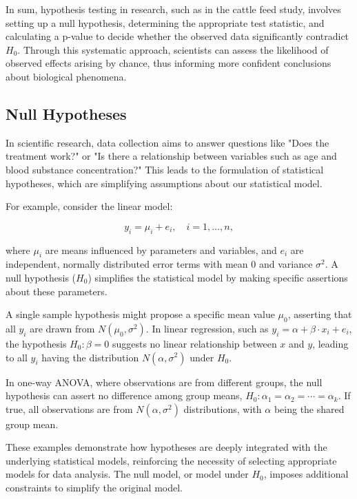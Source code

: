 \documentclass{article}
\begin{document}
In sum, hypothesis testing in research, such as in the cattle feed study, involves setting up a null hypothesis, determining the appropriate test statistic, and calculating a p-value to decide whether the observed data significantly contradict $H_0$. Through this systematic approach, scientists can assess the likelihood of observed effects arising by chance, thus informing more confident conclusions about biological phenomena.

\subsection{Null Hypotheses}

In scientific research, data collection aims to answer questions like "Does the treatment work?" or "Is there a relationship between variables such as age and blood substance concentration?" This leads to the formulation of statistical hypotheses, which are simplifying assumptions about our statistical model.

For example, consider the linear model:

\[
y_{i} = \mu_{i} + e_{i}, \quad i = 1, \ldots, n,
\]

where $\mu_{i}$ are means influenced by parameters and variables, and $e_{i}$ are independent, normally distributed error terms with mean 0 and variance $\sigma^{2}$. A null hypothesis ($H_0$) simplifies the statistical model by making specific assertions about these parameters.

A single sample hypothesis might propose a specific mean value $\mu_0$, asserting that all $y_i$ are drawn from $N(\mu_0, \sigma^2)$. In linear regression, such as $y_i = \alpha + \beta \cdot x_i + e_i$, the hypothesis $H_0: \beta = 0$ suggests no linear relationship between $x$ and $y$, leading to all $y_i$ having the distribution $N(\alpha, \sigma^2)$ under $H_0$.

In one-way ANOVA, where observations are from different groups, the null hypothesis can assert no difference among group means, $H_0: \alpha_1 = \alpha_2 = \cdots = \alpha_k$. If true, all observations are from $N(\alpha, \sigma^2)$ distributions, with $\alpha$ being the shared group mean.

These examples demonstrate how hypotheses are deeply integrated with the underlying statistical models, reinforcing the necessity of selecting appropriate models for data analysis. The null model, or model under $H_0$, imposes additional constraints to simplify the original model.
\end{document}
